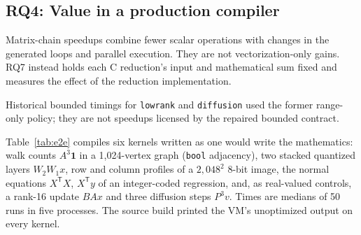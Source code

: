 \documentclass[acmsmall,review,anonymous,nonacm]{acmart}
\begin{document}
\subsection{RQ4: Value in a production compiler}\label{sec:rq4}
Matrix-chain speedups combine fewer scalar operations with changes in the
generated loops and parallel execution. They are not vectorization-only gains.
RQ7 instead holds each C reduction's input and mathematical sum fixed and
measures the effect of the reduction implementation.
\begin{table}[t]
\caption{RQ4 on M1. Six kernels compiled by \texttt{matrixc} to C and by
\PlatCcFirstGcc{} (\texttt{-O3 -march=native -ffp-contract=off}): median time
of the program as written, and speedups over it of the same C under
\texttt{-ffast-math}; of the strict contract; of strict with licensed
reductions (\texttt{-fopenmp-simd}); of the bounded and the algebraic contracts
with licensed reductions; and of strict with licensed reductions on eight
threads. The algebraic contract reorders without proofs. $^\dagger$ marks
outputs that differ from the source program. Results counts distinct outputs
over eleven builds, including SSE2-only builds.}
\label{tab:e2e}\centering\footnotesize\setlength{\tabcolsep}{4pt}
\par\smallskip\parbox{\linewidth}{\footnotesize Historical bounded timings for
\texttt{lowrank} and \texttt{diffusion} used the former range-only policy;
they are not speedups licensed by the repaired bounded contract.}

\end{table}
Table~\ref{tab:e2e} compiles six kernels written as one would write the
mathematics: walk counts $A^3\mathbf 1$ in a 1,024-vertex graph (\texttt{bool}
adjacency), two stacked quantized layers $W_2W_1x$, row and column profiles of a
$2{,}048^2$ 8-bit image, the normal equations $X^{\mathsf T}X$, $X^{\mathsf T}y$
of an integer-coded regression, and, as real-valued controls, a rank-16 update
$BAx$ and three diffusion steps $P^3v$. Times are medians of 50 runs in five
processes. The source build printed the VM's unoptimized output on every kernel.
\end{document}

